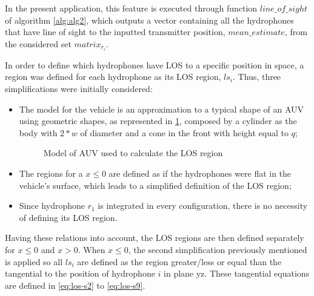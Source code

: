 In the present application, this feature is executed through function $line\_of\_sight$ of algorithm \ref{alg:alg2}, which outputs a vector containing all the hydrophones that have line of sight to the inputted transmitter position, $mean\_estimate$, from the considered set $matrix_{r_{i}}$. 

In order to define which hydrophones have LOS to a specific position in space, a region was defined for each hydrophone as its LOS region, $ls_i$. Thus, three simplifications were initially considered: 
\begin{itemize}
	\item The model for the vehicle is an approximation to a typical shape of an AUV using geometric shapes, as represented in \ref{fig:auv-geo}, composed by a cylinder as the body with $2*w$ of diameter and a cone in the front with height equal to $q$;
	
	\begin{figure}[!htbp]
		\captionsetup{justification=centering,margin=2cm}
		\caption{Model of AUV used to calculate the LOS region}
		\label{fig:auv-geo}
	\end{figure}
	
	\item The regions for a $x \leq 0$ are defined as if the hydrophones were flat in the vehicle's surface, which leads to a simplified definition of the LOS region;
	
	\item Since hydrophone $r_1$ is integrated in every configuration, there is no necessity of defining its LOS region.

\end{itemize}

Having these relations into account, the LOS regions are then defined separately for $x \leq 0$ and $x > 0$. When $x \leq 0$, the second simplification previously mentioned is applied so all $ls_i$ are defined as the region greater/less or equal than the tangential to the position of hydrophone $i$ in plane yz. These tangential equations are defined in \ref{eq:los-s2} to \ref{eq:los-s9}.

